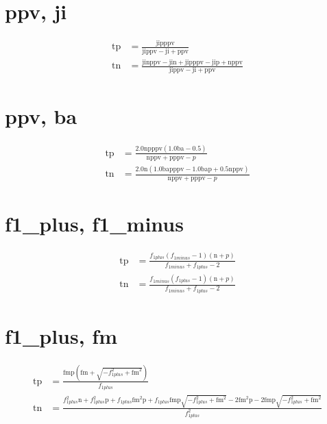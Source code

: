 \documentclass[3p,times]{elsarticle}
\begin{document}
\begin{footnotesize}
\begin{landscape}
\section{ppv, ji}
\begin{align}
\mathrm{tp} &= \frac{\mathrm{ji} \mathrm{p} \mathrm{ppv}}{\mathrm{ji} \mathrm{ppv} - \mathrm{ji} + \mathrm{ppv}}\\
\mathrm{tn} &= \frac{\mathrm{ji} \mathrm{n} \mathrm{ppv} - \mathrm{ji} \mathrm{n} + \mathrm{ji} \mathrm{p} \mathrm{ppv} - \mathrm{ji} \mathrm{p} + \mathrm{n} \mathrm{ppv}}{\mathrm{ji} \mathrm{ppv} - \mathrm{ji} + \mathrm{ppv}}
\end{align}
\section{ppv, ba}
\begin{align}
\mathrm{tp} &= \frac{2.0 \mathrm{n} \mathrm{p} \mathrm{ppv} \left(1.0 \mathrm{ba} - 0.5\right)}{\mathrm{n} \mathrm{ppv} + \mathrm{p} \mathrm{ppv} - p}\\
\mathrm{tn} &= \frac{2.0 \mathrm{n} \left(1.0 \mathrm{ba} \mathrm{p} \mathrm{ppv} - 1.0 \mathrm{ba} \mathrm{p} + 0.5 \mathrm{n} \mathrm{ppv}\right)}{\mathrm{n} \mathrm{ppv} + \mathrm{p} \mathrm{ppv} - p}
\end{align}
\section{f1_plus, f1_minus}
\begin{align}
\mathrm{tp} &= \frac{f_{1 plus} \left(f_{1 minus} - 1\right) \left(\mathrm{n} + p\right)}{f_{1 minus} + f_{1 plus} - 2}\\
\mathrm{tn} &= \frac{f_{1 minus} \left(f_{1 plus} - 1\right) \left(\mathrm{n} + p\right)}{f_{1 minus} + f_{1 plus} - 2}
\end{align}
\section{f1_plus, fm}
\begin{align}
\mathrm{tp} &= \frac{\mathrm{fm} \mathrm{p} \left(\mathrm{fm} + \sqrt{- f_{1 plus}^{2} + \mathrm{fm}^{2}}\right)}{f_{1 plus}}\\
\mathrm{tn} &= \frac{f_{1 plus}^{2} \mathrm{n} + f_{1 plus}^{2} \mathrm{p} + f_{1 plus} \mathrm{fm}^{2} \mathrm{p} + f_{1 plus} \mathrm{fm} \mathrm{p} \sqrt{- f_{1 plus}^{2} + \mathrm{fm}^{2}} - 2 \mathrm{fm}^{2} \mathrm{p} - 2 \mathrm{fm} \mathrm{p} \sqrt{- f_{1 plus}^{2} + \mathrm{fm}^{2}}}{f_{1 plus}^{2}}
\end{align}

\end{landscape}
\end{footnotesize}
\end{document}
